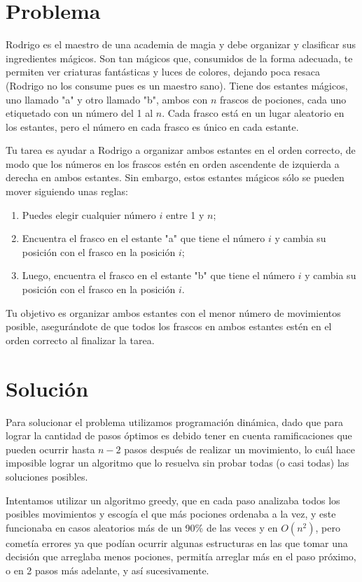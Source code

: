 \documentclass{article}
\begin{document}
\section*{Problema}

Rodrigo es el maestro de una academia de magia y debe organizar y clasificar sus ingredientes mágicos. Son tan mágicos que, consumidos de la forma adecuada, te permiten ver criaturas fantásticas y luces de colores, dejando poca resaca (Rodrigo no los consume pues es un maestro sano). Tiene dos estantes mágicos, uno llamado "a" y otro llamado "b", ambos con $n$ frascos de pociones, cada uno etiquetado con un número del 1 al $n$. Cada frasco está en un lugar aleatorio en los estantes, pero el número en cada frasco es único en cada estante.

Tu tarea es ayudar a Rodrigo a organizar ambos estantes en el orden correcto, de modo que los números en los frascos estén en orden ascendente de izquierda a derecha en ambos estantes. Sin embargo, estos estantes mágicos sólo se pueden mover siguiendo unas reglas:

\begin{enumerate}
    \item Puedes elegir cualquier número $i$ entre 1 y $n$;
    \item Encuentra el frasco en el estante "a" que tiene el número $i$ y cambia su posición con el frasco en la posición $i$;
    \item Luego, encuentra el frasco en el estante "b" que tiene el número $i$ y cambia su posición con el frasco en la posición $i$.
\end{enumerate}

Tu objetivo es organizar ambos estantes con el menor número de movimientos posible, asegurándote de que todos los frascos en ambos estantes estén en el orden correcto al finalizar la tarea.

\section*{Solución}

Para solucionar el problema utilizamos programación dinámica, dado que para lograr la cantidad de pasos óptimos es debido tener en cuenta ramificaciones que pueden ocurrir hasta $n - 2$ pasos después de realizar un movimiento, lo cuál hace imposible lograr un algoritmo que lo resuelva sin probar todas (o casi todas) las soluciones posibles.

Intentamos utilizar un algoritmo greedy, que en cada paso analizaba todos los posibles movimientos y escogía el que más pociones ordenaba a la vez, y este funcionaba en casos aleatorios más de un 90\% de las veces y en $O(n^2)$, pero cometía errores ya que podían ocurrir algunas estructuras en las que tomar una decisión que arreglaba menos pociones, permitía arreglar más en el paso próximo, o en 2 pasos más adelante, y así sucesivamente.
\end{document}
